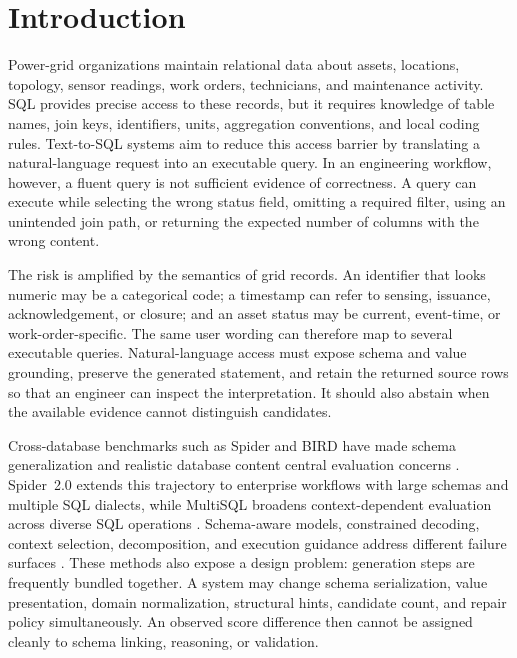 \documentclass[applsci,article,submit,moreauthors]{Definitions/mdpi}
\begin{document}
\section{Introduction}

Power-grid organizations maintain relational data about assets, locations, topology, sensor readings, work orders, technicians, and maintenance activity. SQL provides precise access to these records, but it requires knowledge of table names, join keys, identifiers, units, aggregation conventions, and local coding rules. Text-to-SQL systems aim to reduce this access barrier by translating a natural-language request into an executable query. In an engineering workflow, however, a fluent query is not sufficient evidence of correctness. A query can execute while selecting the wrong status field, omitting a required filter, using an unintended join path, or returning the expected number of columns with the wrong content.

The risk is amplified by the semantics of grid records. An identifier that looks numeric may be a categorical code; a timestamp can refer to sensing, issuance, acknowledgement, or closure; and an asset status may be current, event-time, or work-order-specific. The same user wording can therefore map to several executable queries. Natural-language access must expose schema and value grounding, preserve the generated statement, and retain the returned source rows so that an engineer can inspect the interpretation. It should also abstain when the available evidence cannot distinguish candidates.

Cross-database benchmarks such as Spider and BIRD have made schema generalization and realistic database content central evaluation concerns \cite{yu2018spider,li2023bird}. Spider~2.0 extends this trajectory to enterprise workflows with large schemas and multiple SQL dialects, while MultiSQL broadens context-dependent evaluation across diverse SQL operations \cite{lei2025spider2,li2024multisql}. Schema-aware models, constrained decoding, context selection, decomposition, and execution guidance address different failure surfaces \cite{wang2020ratsql,scholak2021picard,nan2023enhancing,pourreza2023dinsql,talaei2024chess}. These methods also expose a design problem: generation steps are frequently bundled together. A system may change schema serialization, value presentation, domain normalization, structural hints, candidate count, and repair policy simultaneously. An observed score difference then cannot be assigned cleanly to schema linking, reasoning, or validation.
\end{document}
